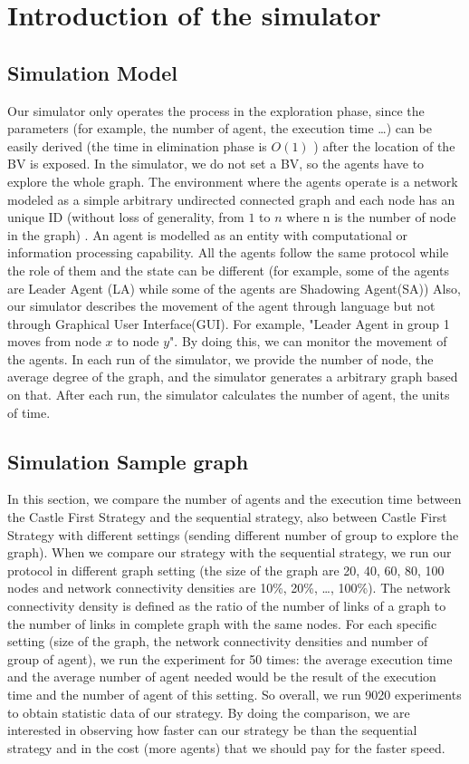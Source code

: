 \section{Introduction of the simulator}
\subsection{Simulation Model}
Our simulator only operates the process in the exploration phase, since the parameters (for example, the number of agent, the execution time \ldots) can be easily derived (the time in elimination phase is $O(1)$ ) after the location of the BV is exposed. In the simulator, we do not set a BV, so the agents have to explore the whole graph. The environment where the agents operate is a network modeled as a simple arbitrary undirected connected graph and each node has an unique ID (without loss of generality, from $1$ to $n$ where n is the number of node in the graph) . An agent is modelled as an entity with computational or information processing capability. All the agents follow the same protocol while the role of them and the state can be different (for example, some of the agents are Leader Agent (LA) while some of the agents are Shadowing Agent(SA)) Also, our simulator describes the movement of the agent through language but not through Graphical User Interface(GUI). For example, "Leader Agent in group 1 moves from node $x$ to node $y$". By doing this, we can monitor the movement of the agents. In each run of the simulator, we provide the number of node, the average degree of the graph, and the simulator generates a arbitrary graph based on that. After each run, the simulator calculates the number of agent, the units of time.          

\subsection{Simulation Sample graph} 
In this section, we compare the number of agents and the execution time between the Castle First Strategy and  the sequential strategy\cite{cai}, also between Castle First Strategy with different settings (sending different number of group to explore the graph). When we compare our strategy with the sequential strategy, we run our protocol in different graph setting (the size of the graph are 20, 40, 60, 80, 100 nodes and network connectivity densities are 10\%, 20\%, \ldots, 100\%). The network connectivity density is defined as the ratio of the number of links of a graph to the number of links in complete graph with the same nodes. For each specific setting (size of the graph, the network connectivity densities and number of group of agent), we run the experiment for 50 times: the average execution time and the average number of agent needed would be the result of the execution time and the number of agent of this setting. So overall, we run 9020 experiments to obtain statistic data of our strategy. By doing the comparison, we are interested in observing how faster can our strategy be than the sequential strategy and in the cost (more agents) that we should pay for the faster speed. 

